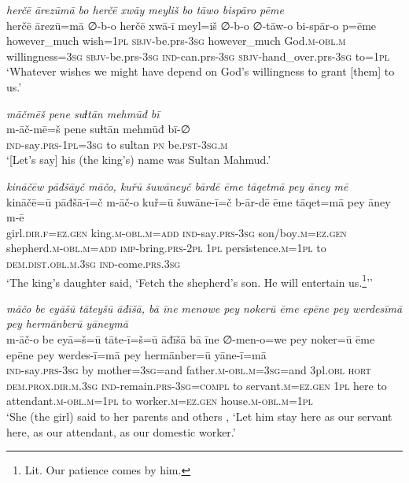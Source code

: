 \ea \label{ŠJ.89}
\textit{herčē ārezūmā bo herčē xwāy meyliš bo tāwo bispāro pēme} \\ 
\gll herčē ārezū=mā ∅-b-o herčē xwā-ī meyl=iš ∅-b-o ∅-tāw-o bi-spār-o p=ēme \\ 
 however\_much wish\textsc{=\textsc{1pl}} \textsc{sbjv-}be.prs\textsc{-3sg} however\_much God\textsc{.m}\textsc{-obl}\textsc{.m} willingness\textsc{=3sg} \textsc{sbjv-}be.prs\textsc{-3sg} \textsc{ind-}can.prs\textsc{-3sg} \textsc{sbjv-}hand\_over.prs\textsc{-3sg} to=\textsc{1pl} \\ 
\glt `Whatever wishes we might have depend on God’s willingness to grant [them] to us.'
\z 
 
\ea \label{KŠ.14}
\textit{māčmēš pene suɫtān mehmūđ bī} \\ 
\gll m-āč-mē=š pene suɫtān mehmūđ bī-∅ \\ 
 \textsc{ind-}say\textsc{.prs}\textsc{-\textsc{1pl}}\textsc{=3sg} to sultan \textsc{pn} be\textsc{.pst}\textsc{-3sg}\textsc{.m} \\ 
\glt `[Let’s say] his (the king's) name was Sultan Mahmud.'
\z 
 
\ea \label{KŠ.40}
\textit{kināčēw pāđšāyč māčo, kuřū šuwāneyč bārdē ēme tāqetmā pey āney mē} \\ 
\gll kināčē=ū pāđšā-ī=č m-āč-o kuř=ū šuwāne-ī=č b-ār-dē ēme tāqet=mā pey āney m-ē \\ 
 girl\textsc{.dir}\textsc{.f}\textsc{=ez.gen} king\textsc{.m}\textsc{-obl}\textsc{.m}\textsc{=add} \textsc{ind-}say\textsc{.prs}\textsc{-3sg} son/boy\textsc{.m}\textsc{=ez.gen} shepherd\textsc{.m}\textsc{-obl}\textsc{.m}\textsc{=add} \textsc{imp-}bring\textsc{.prs}-\textsc{2pl} \textsc{1pl} persistence\textsc{.m}\textsc{=\textsc{1pl}} to \textsc{dem.dist}\textsc{.obl}\textsc{.m}\textsc{.3sg} \textsc{ind-}come\textsc{.prs}\textsc{.3sg} \\ 
\glt `The king’s daughter said, ‘Fetch the shepherd’s son. He will entertain us.\footnote{Lit. Our patience comes by him.}’'
\z 
 
\ea \label{KŠ.43}
\textit{māčo be eyāšū tāteyšū āđīšā, bā īne menowe pey nokerū ēme epēne pey werdesīmā pey hermānberū yāneymā} \\ 
\gll m-āč-o be eyā=š=ū tāte-ī=š=ū āđīšā bā īne ∅-men-o=we pey noker=ū ēme epēne pey werdes-ī=mā pey hermānber=ū yāne-ī=mā \\ 
 \textsc{ind-}say\textsc{.prs}\textsc{-3sg} by mother\textsc{=3sg}=and father\textsc{.m}\textsc{-obl}\textsc{.m}\textsc{=3sg}=and 3pl\textsc{.obl} \textsc{hort} \textsc{dem.prox}\textsc{.dir}\textsc{.m}\textsc{.3sg} \textsc{ind-}remain\textsc{.prs}\textsc{-3sg}\textsc{=compl} to servant\textsc{.m}\textsc{=ez.gen} \textsc{1pl} here to attendant\textsc{.m}\textsc{-obl}\textsc{.m}\textsc{=\textsc{1pl}} to worker\textsc{.m}\textsc{=ez.gen} house\textsc{.m}\textsc{-obl}\textsc{.m}\textsc{=\textsc{1pl}} \\ 
\glt `She (the girl) said to her parents and others , ‘Let him stay here as our servant here, as our attendant, as our domestic worker.'
\z 
 
